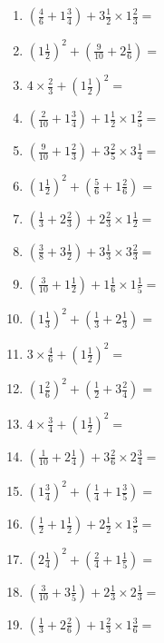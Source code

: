 \documentclass[12pt]{article}
\begin{document}
\begin{enumerate}
\item \large $ (\frac{4}{6} + 1 \frac{3}{4}) + 3 \frac{1}{2} \times 1 \frac{2}{3} = $ \vspace{1.8cm}
\item \large $ (1 \frac{1}{2})^2 + (\frac{9}{10} + 2 \frac{1}{6}) = $ \vspace{1.8cm}
\item \large $ 4 \times \frac{2}{3} + (1 \frac{1}{2})^2 = $ \vspace{1.8cm}
\item \large $ (\frac{2}{10} + 1 \frac{3}{4}) + 1 \frac{1}{2} \times 1 \frac{2}{5} = $ \vspace{1.8cm}
\item \large $ (\frac{9}{10} + 1 \frac{2}{3}) + 3 \frac{2}{5} \times 3 \frac{1}{4} = $ \vspace{1.8cm}
\item \large $ (1 \frac{1}{2})^2 + (\frac{5}{6} + 1 \frac{2}{6}) = $ \vspace{1.8cm}
\item \large $ (\frac{1}{3} + 2 \frac{2}{3}) + 2 \frac{2}{3} \times 1 \frac{1}{2} = $ \vspace{1.8cm}
\item \large $ (\frac{3}{8} + 3 \frac{1}{2}) + 3 \frac{1}{3} \times 3 \frac{2}{3} = $ \vspace{1.8cm}
\item \large $ (\frac{3}{10} + 1 \frac{1}{2}) + 1 \frac{1}{6} \times 1 \frac{1}{5} = $ \vspace{1.8cm}
\newpage
\item \large $ (1 \frac{1}{3})^2 + (\frac{1}{3} + 2 \frac{1}{3}) = $ \vspace{1.8cm}
\item \large $ 3 \times \frac{4}{6} + (1 \frac{1}{2})^2 = $ \vspace{1.8cm}
\item \large $ (1 \frac{2}{6})^2 + (\frac{1}{2} + 3 \frac{2}{4}) = $ \vspace{1.8cm}
\item \large $ 4 \times \frac{3}{4} + (1 \frac{1}{2})^2 = $ \vspace{1.8cm}
\item \large $ (\frac{1}{10} + 2 \frac{1}{4}) + 3 \frac{2}{6} \times 2 \frac{3}{4} = $ \vspace{1.8cm}
\item \large $ (1 \frac{3}{4})^2 + (\frac{1}{4} + 1 \frac{3}{5}) = $ \vspace{1.8cm}
\item \large $ (\frac{1}{2} + 1 \frac{1}{2}) + 2 \frac{1}{2} \times 1 \frac{3}{5} = $ \vspace{1.8cm}
\item \large $ (2 \frac{1}{4})^2 + (\frac{2}{4} + 1 \frac{1}{5}) = $ \vspace{1.8cm}
\item \large $ (\frac{3}{10} + 3 \frac{1}{5}) + 2 \frac{1}{3} \times 2 \frac{1}{3} = $ \vspace{1.8cm}
\item \large $ (\frac{1}{3} + 2 \frac{2}{6}) + 1 \frac{2}{3} \times 1 \frac{3}{6} = $ \vspace{1.8cm}
\end{enumerate}\newpage
\end{document}
